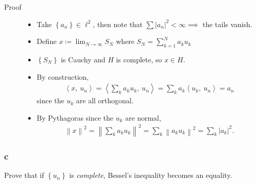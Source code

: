 \begin{description}
\item[Proof]
\hfill

\begin{itemize}
\item
  Take \(\left\{{a_n}\right\} \in \ell^2\), then note that
  \(\sum {\left\lvert {a_n} \right\rvert}^2 < \infty \implies\) the
  tails vanish.
\item
  Define \(x \coloneqq\displaystyle\lim_{N\to\infty} S_N\) where
  \(S_N = \sum_{k=1}^N a_k u_k\)
\item
  \(\left\{{S_N}\right\}\) is Cauchy and \(H\) is complete, so
  \(x\in H\).
\item
  By construction,
  \begin{align*}     {\left\langle {x},~{u_n} \right\rangle} = {\left\langle {\sum_k a_k u_k},~{u_n} \right\rangle} = \sum_k a_k {\left\langle {u_k},~{u_n} \right\rangle} = a_n      \end{align*}
  since the \(u_k\) are all orthogonal.
\item
  By Pythagoras since the \(u_k\) are normal,
  \begin{align*}     {\left\lVert {x} \right\rVert}^2 = {\left\lVert {\sum_k a_k u_k} \right\rVert}^2 = \sum_k {\left\lVert {a_k u_k} \right\rVert}^2 = \sum_k {\left\lvert {a_k} \right\rvert}^2     .\end{align*}
\end{itemize}
\end{description}

\hypertarget{c-1}{%
\subsubsection{c}\label{c-1}}

Prove that if \(\left\{{u_n}\right\}\) is \emph{complete}, Bessel's
inequality becomes an equality.

